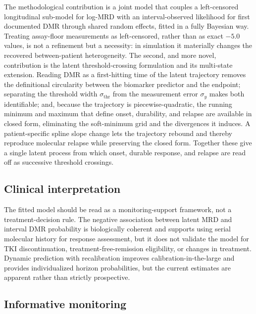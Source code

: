 \documentclass[11pt]{article}
\begin{document}
The methodological contribution is a joint model that couples a
left-censored longitudinal sub-model for log-MRD with an interval-observed
likelihood for first documented DMR through shared random effects, fitted in
a fully Bayesian way. Treating assay-floor measurements as left-censored,
rather than as exact $-5.0$ values, is not a refinement but a necessity: in
simulation it materially changes the recovered between-patient
heterogeneity. The second, and more novel, contribution is the latent threshold-crossing
formulation and its multi-state extension. Reading DMR as a first-hitting time
of the latent trajectory removes the definitional circularity between the
biomarker predictor and the endpoint; separating the threshold width
$\sigma_{\mathrm{thr}}$ from the measurement error $\sigma_y$ makes both
identifiable; and, because the trajectory is piecewise-quadratic, the running
minimum and maximum that define onset, durability, and relapse are available in
closed form, eliminating the soft-minimum grid and the divergences it induces.
A patient-specific spline slope change lets the trajectory rebound and thereby
reproduce molecular relapse while preserving the closed form. Together these
give a single latent process from which onset, durable response, and relapse
are read off as successive threshold crossings.

\subsection{Clinical interpretation}

The fitted model should be read as a monitoring-support framework, not a
treatment-decision rule. The negative association between latent MRD and
interval DMR probability is biologically coherent and supports using
serial molecular history for response assessment, but it does not validate
the model for TKI discontinuation, treatment-free-remission eligibility,
or changes in treatment. Dynamic prediction with recalibration improves
calibration-in-the-large and provides individualized horizon
probabilities, but the current estimates are apparent rather than strictly
prospective.

\subsection{Informative monitoring}
\end{document}
